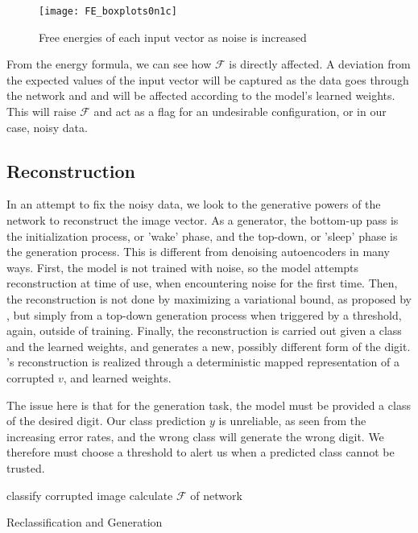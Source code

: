 \documentclass{report}
\begin{document}
\begin{figure}
	\centering
		\texttt{[image: FE\_boxplots0n1c]}
	\caption{Free energies of each input vector as noise is increased}
	\label{fig:nrgs}
\end{figure}


From the energy formula, we can see how $\mathcal{F}$ is directly affected. A deviation from the expected values of the input vector will be captured as the data goes through the network and and will be affected according to the model's learned weights. This will raise $\mathcal{F}$ and act as a flag for an undesirable configuration, or in our case, noisy data.


\subsection{Reconstruction}
In an attempt to fix the noisy data, we look to the generative powers of the network to reconstruct the image vector. As a generator, the bottom-up pass is the initialization process, or 'wake' phase, and the top-down, or 'sleep' phase is the generation process. This is different from denoising autoencoders in many ways. First, the model is not trained with noise, so the model attempts reconstruction at time of use, when encountering noise for the first time. Then, the reconstruction is not done by maximizing a variational bound, as proposed by \citep{Vincent}, but simply from a top-down generation process when triggered by a threshold, again, outside of training. Finally, the reconstruction is carried out given a class and the learned weights, and generates a new, possibly different form of the digit. \citep{Vincent}'s reconstruction is realized through a deterministic mapped representation of a corrupted $v$, and learned weights.

The issue here is that for the generation task, the model must be provided a class of the desired digit. Our class prediction $y$ is unreliable, as seen from the increasing error rates, and the wrong class will generate the wrong digit. We therefore must choose a threshold to alert us when a predicted class cannot be trusted.


\begin{algorithm}[H]
  classify corrupted image\;
  calculate $\mathcal{F}$ of network\;
 \caption{Reclassification and Generation}
\end{algorithm}
\end{document}
